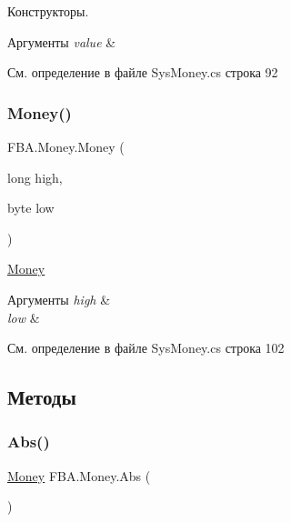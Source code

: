 Конструкторы. 


\begin{DoxyParams}{Аргументы}
{\em value} & \\
\hline
\end{DoxyParams}


См. определение в файле Sys\+Money.\+cs строка 92

\mbox{\label{struct_f_b_a_1_1_money_ad63c0cd25c5167ffa0d50c7f329bc5b9}} 
\subsubsection{\texorpdfstring{Money()}{Money()}\hspace{0.1cm}{\footnotesize\ttfamily [2/2]}}
{\footnotesize\ttfamily F\+B\+A.\+Money.\+Money (\begin{DoxyParamCaption}\item[{long}]{high,  }\item[{byte}]{low }\end{DoxyParamCaption})}



\mbox{\hyperlink{struct_f_b_a_1_1_money}{Money}} 


\begin{DoxyParams}{Аргументы}
{\em high} & \\
\hline
{\em low} & \\
\hline
\end{DoxyParams}


См. определение в файле Sys\+Money.\+cs строка 102



\subsection{Методы}
\mbox{\label{struct_f_b_a_1_1_money_a293be80e88859bd09a3071cbf3264304}} 
\subsubsection{\texorpdfstring{Abs()}{Abs()}}
{\footnotesize\ttfamily \mbox{\hyperlink{struct_f_b_a_1_1_money}{Money}} F\+B\+A.\+Money.\+Abs (\begin{DoxyParamCaption}{ }\end{DoxyParamCaption})}



